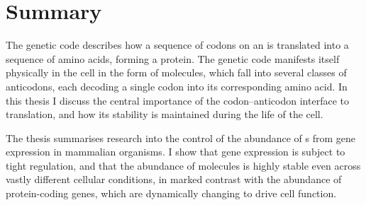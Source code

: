 \chapter*{Summary}

The genetic code describes how a sequence of codons on an  is
translated into a sequence of amino acids, forming a protein. The genetic code
manifests itself physically in the cell in the form of  molecules,
which fall into several classes of anticodons, each decoding a single codon into
its corresponding amino acid. In this thesis I discuss the central importance of
the codon--anticodon interface to translation, and how its stability is
maintained during the life of the cell.

The thesis summarises research into the control of the abundance of
s from  gene expression in mammalian organisms. I show
that  gene expression is subject to tight regulation, and that the
abundance of  molecules is highly stable even across vastly different
cellular conditions, in marked contrast with the abundance of protein-coding
genes, which are dynamically changing to drive cell function.
